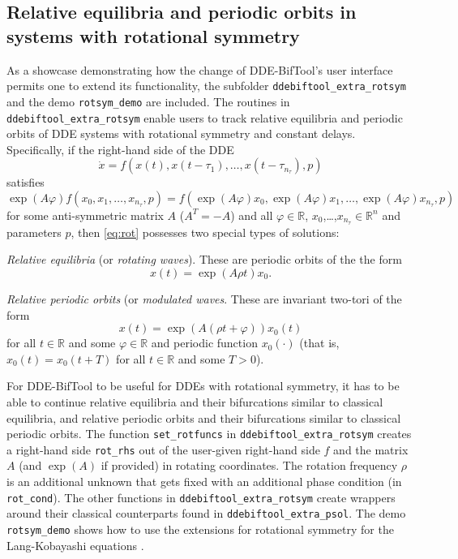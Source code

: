 \documentclass[11pt]{scrartcl}
\renewcommand{\phi}{\varphi}
\newcommand{\R}{\mathbb{R}}
\newcommand{\blist}[1]{\mbox{\lstinline!#1!}}  \newlength{\tabw}
\begin{document}
\subsection{Relative equilibria and periodic orbits in systems with
  rotational symmetry}
\label{sec:rot}

As a showcase demonstrating how the change of DDE-BifTool's user
interface permits one to extend its functionality, the subfolder
\texttt{ddebiftool\_extra\_rotsym} and the demo \texttt{rotsym\_demo}
are included. The routines in \texttt{ddebiftool\_extra\_rotsym}
enable users to track relative equilibria and periodic orbits of DDE
systems with rotational symmetry and constant delays. Specifically, if
the right-hand side of the DDE
\begin{equation}\label{eq:rot}
  \dot x=f(x(t),x(t-\tau_1),\ldots,x(t-\tau_{n_\tau}),p)
\end{equation}
satisfies
\begin{displaymath}
  \exp(A\phi)f(x_0,x_1,\ldots,x_{n_\tau},p)=
  f(\exp(A\phi)x_0,\exp(A\phi)x_1,\ldots,
  \exp(A\phi)x_{n_\tau},p)
\end{displaymath}
for some anti-symmetric matrix $A$ ($A^T=-A$) and all $\phi\in\R$,
$x_0$,\ldots,$x_{n_\tau}\in\R^n$ and parameters $p$, then
\eqref{eq:rot} possesses two special types of solutions:
\begin{compactitem}
\item \emph{Relative equilibria} (or \emph{rotating waves}). These are
  periodic orbits of the the form
  \begin{equation}
    x(t)=\exp(A\rho t)x_0\mbox{.}\label{eq:rw}
\end{equation}
\item \emph{Relative periodic orbits} (or \emph{modulated
    waves}. These are invariant two-tori of the form
  \begin{equation}
    x(t)=\exp(A(\rho t+\phi))x_0(t)\label{eq:mw}
  \end{equation}
  for all $t\in\R$ and some $\phi\in\R$ and periodic function
  $x_0(\cdot)$ (that is, $x_0(t)=x_0(t+T)$ for all $t\in\R$ and some $T>0$).
\end{compactitem}
For DDE-BifTool to be useful for DDEs with rotational symmetry, it
has to be able to continue relative equilibria and their bifurcations
similar to classical equilibria, and relative periodic orbits and their
bifurcations similar to classical periodic orbits. The function
\blist{set_rotfuncs} in \texttt{ddebiftool\_extra\_rotsym} creates a
right-hand side \blist{rot_rhs} out of the user-given right-hand side
$f$ and the matrix $A$ (and $\exp(A)$ if provided) in rotating
coordinates. The rotation frequency $\rho$ is an additional unknown
that gets fixed with an additional phase condition (in
\blist{rot_cond}). The other functions in
\texttt{ddebiftool\_extra\_rotsym} create wrappers around their
classical counterparts found in \texttt{ddebiftool\_extra\_psol}. The
demo \texttt{rotsym\_demo} shows how to use the extensions for
rotational symmetry for the Lang-Kobayashi equations \cite{LK80}.
\end{document}

